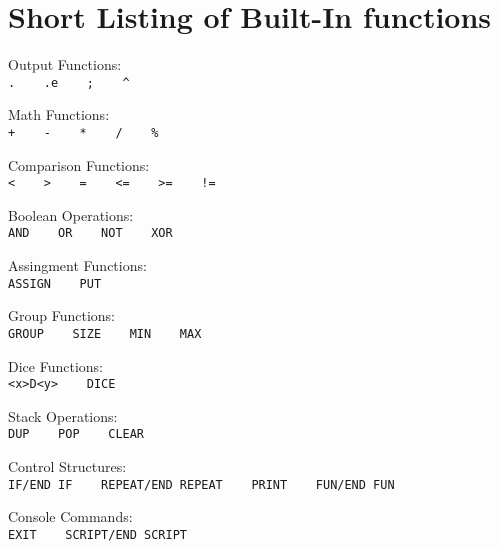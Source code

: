 \chapter{Short Listing of Built-In functions}
\label{codeListing}

\noindent Output Functions:\\
\indent\texttt{. \ \ \  .e \ \ \  ; \ \ \ \^{}}

\noindent Math Functions:\\
\indent\texttt{+ \ \ \ - \ \ \ * \ \ \ / \ \ \ \%}

\noindent Comparison Functions:\\
\indent\texttt{< \ \ \ > \ \ \ = \ \ \ <= \ \ \ >= \ \ \ !=}

\noindent Boolean Operations:\\
\indent\texttt{AND \ \ \ OR \ \ \ NOT \ \ \ XOR}

\noindent Assingment Functions:\\
\indent\texttt{ASSIGN \ \ \ PUT}

\noindent Group Functions:\\
\indent\texttt{GROUP \ \ \ SIZE \ \ \ MIN \ \ \ MAX}

\noindent Dice Functions:\\
\indent\texttt{<x>D<y> \ \ \ DICE}

\noindent Stack Operations:\\
\indent\texttt{DUP \ \ \ POP \ \ \ CLEAR}

\noindent Control Structures:\\
\indent\texttt{IF/END IF \ \ \ REPEAT/END REPEAT \ \ \ PRINT \ \ \ FUN/END FUN}

\noindent Console Commands:\\
\indent\texttt{EXIT \ \ \ SCRIPT/END SCRIPT}
